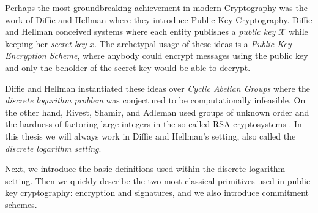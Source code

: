 Perhaps the most groundbreaking achievement in modern Cryptography was the work of Diffie and Hellman \cite{DifHel76} where they introduce Public-Key Cryptography. Diffie and Hellman conceived systems where each entity publishes a \emph{public key} $\mathcal{X}$ while keeping her \emph{secret key} $x$. The archetypal usage of these ideas is a \emph{Public-Key Encryption Scheme}, where anybody could encrypt messages using the public key and only the beholder of the secret key would be able to decrypt.

Diffie and Hellman instantiated these ideas over \emph{Cyclic Abelian Groups} where the \emph{discrete logarithm problem} was conjectured to be computationally infeasible. On the other hand, Rivest, Shamir, and Adleman used groups of unknown order and the hardness of factoring large integers in the so called RSA cryptosystems \cite{RivShaAdl78}.
In this thesis we will always work in Diffie and Hellman's setting, also called the \emph{discrete logarithm setting}.

Next, we introduce the basic definitions used within the discrete logarithm setting. Then we quickly describe the two most classical primitives used in public-key cryptography: encryption and signatures, and we also introduce commitment schemes.

